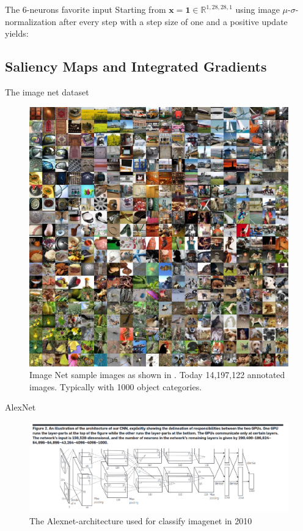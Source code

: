 \documentclass{beamer}
\begin{document}
    \begin{frame}{The 6-neurons favorite input}
      Starting from $\mathbf{x} = \mathbf{1} \in \mathbb{R}^{1,28,28,1}$
      using image $\mu$-$\sigma$-normalization after every step
      with a step size of one and a positive update yields:
      \begin{figure}
        
      \end{figure}
    \end{frame}

    \subsection{Saliency Maps and Integrated Gradients}

    \begin{frame}{The image net dataset}
      \begin{figure}
        \includegraphics[width=0.6\linewidth]{figures/ImageNet.jpg}
        \caption{Image Net sample images as shown in \cite{russakovsky2015imagenet}. Today 14,197,122 annotated images. Typically with 1000 object
        categories.}
      \end{figure}
    \end{frame}

 
    \begin{frame}{AlexNet}
      \begin{figure}
        \includegraphics[width=\linewidth]{./figures/alexnet.png}
        \caption{The Alexnet-architecture used for classify imagenet in 2010  \cite{krizhevsky2017imagenet}}
      \end{figure}
    \end{frame}
\end{document}
